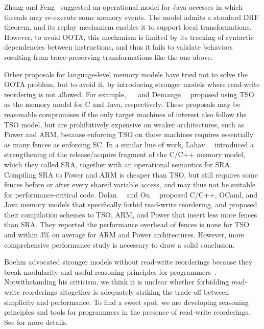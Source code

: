 Zhang and Feng~\cite{Zhang2016} suggested an operational model for Java accesses in which threads may re-execute some memory events.
The model admits a standard DRF theorem, and its replay mechanism enables it to support local transformations.
However, to avoid OOTA, this mechanism is limited by its tracking of syntactic dependencies between instructions,
and thus it fails to validate behaviors resulting from trace-preserving transformations like the one above.

Other proposals for language-level memory models have tried not to solve the OOTA problem, but to avoid it,
by introducing stronger models where read-write reordering is not allowed.
For example, \sevcik~\etal~\cite{compcerttso} and Demange~\etal~\cite{bmm} proposed using TSO as the memory model for C and Java, respectively. 
These proposals may be reasonable compromises if the only target machines of interest also follow the TSO model,
but are prohibitively expensive on weaker architectures, such as Power and ARM,
because enforcing TSO on those machines requires essentially as many fences as enforcing SC.
In a similar line of work, Lahav~\etal~\cite{sra} introduced a strengthening of the release/acquire fragment of the C/C++ memory model, which they called SRA, together with an operational semantics for SRA\@.
Compiling SRA to Power and ARM is cheaper than TSO, but still requires some fences before or after every shared variable access, and may thus not be suitable for performance-critical code.
%
Dolan~\etal{}~\cite{DBLP:conf/pldi/DolanSM18} and Ou~\etal{}~\cite{DBLP:journals/pacmpl/OuD18}
proposed C/C++, OCaml, and Java memory models that specifically forbid read-write reordering, and
proposed their compilation schemes to TSO, ARM, and Power that insert less more fences than SRA.
They reported the performance overhead of fences is none for TSO and within 3\% on average for ARM
and Power architectures.  However, more comprehensive performance study is necessary to draw a solid
conclusion.

Boehm advocated stronger models without read-write reorderings because they break modularity and
useful reasoning principles for programmers~\cite{boehm-oota}.  Notwithstanding his criticism, we
think it is unclear whether forbidding read-write reorderings altogether is adequately striking the
trade-off between simplicity and performance.  To find a sweet spot, we are developing reasoning
principles and tools for programmers in the presence of read-write reorderings.  See
 for more details.

